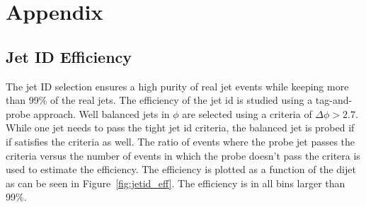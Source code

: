 
\chapter{Appendix}
\label{ch:app:physics}

\section{Jet ID Efficiency}

The jet ID selection ensures a high purity of real jet events while keeping more than 99\% of the real jets.
The efficiency of the jet id is studied using a tag-and-probe approach. Well balanced jets in $\phi$ are selected
using a criteria of $\Delta \phi > 2.7$. While one jet needs to pass the tight jet id criteria, the balanced jet is probed
if if satisfies the criteria as well. The ratio of events where the probe jet passes the criteria versus the number of events
in which the probe doesn't pass the critera is used to estimate the efficiency. The efficiency is plotted as a function of the
dijet \ptavg as can be seen in Figure~\ref{fig:jetid_eff}. The efficiency is in all bins larger than 99\%.


